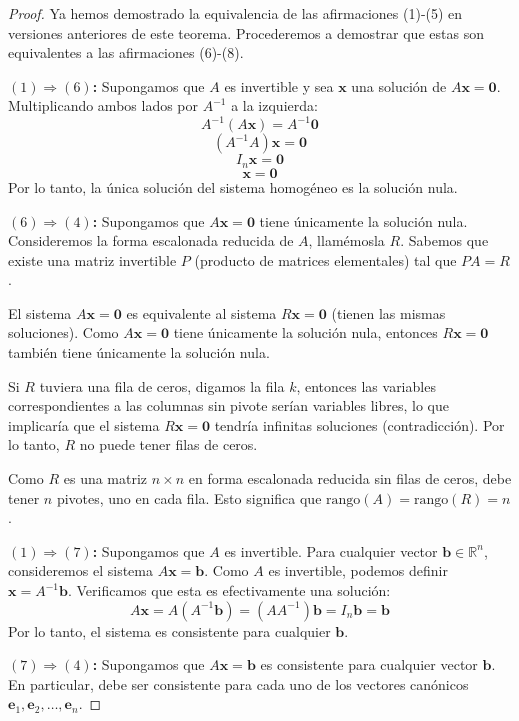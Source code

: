 \begin{proof}
Ya hemos demostrado la equivalencia de las afirmaciones (1)-(5) en versiones anteriores de este teorema. Procederemos a demostrar que estas son equivalentes a las afirmaciones (6)-(8).

\textbf{$(1) \Rightarrow (6)$:}
Supongamos que $A$ es invertible y sea $\mathbf{x}$ una solución de $A\mathbf{x}=\mathbf{0}$. Multiplicando ambos lados por $A^{-1}$ a la izquierda:
$$A^{-1}(A\mathbf{x}) = A^{-1}\mathbf{0}$$
$$(A^{-1}A)\mathbf{x} = \mathbf{0}$$
$$I_n\mathbf{x} = \mathbf{0}$$
$$\mathbf{x} = \mathbf{0}$$
Por lo tanto, la única solución del sistema homogéneo es la solución nula.

\textbf{$(6) \Rightarrow (4)$:}
Supongamos que $A\mathbf{x}=\mathbf{0}$ tiene únicamente la solución nula. Consideremos la forma escalonada reducida de $A$, llamémosla $R$. Sabemos que existe una matriz invertible $P$ (producto de matrices elementales) tal que $PA = R$.

El sistema $A\mathbf{x}=\mathbf{0}$ es equivalente al sistema $R\mathbf{x}=\mathbf{0}$ (tienen las mismas soluciones). Como $A\mathbf{x}=\mathbf{0}$ tiene únicamente la solución nula, entonces $R\mathbf{x}=\mathbf{0}$ también tiene únicamente la solución nula.

Si $R$ tuviera una fila de ceros, digamos la fila $k$, entonces las variables correspondientes a las columnas sin pivote serían variables libres, lo que implicaría que el sistema $R\mathbf{x}=\mathbf{0}$ tendría infinitas soluciones (contradicción). Por lo tanto, $R$ no puede tener filas de ceros.

Como $R$ es una matriz $n \times n$ en forma escalonada reducida sin filas de ceros, debe tener $n$ pivotes, uno en cada fila. Esto significa que $\text{rango}(A) = \text{rango}(R) = n$.

\textbf{$(1) \Rightarrow (7)$:}
Supongamos que $A$ es invertible. Para cualquier vector $\mathbf{b} \in \mathbb{R}^n$, consideremos el sistema $A\mathbf{x}=\mathbf{b}$. Como $A$ es invertible, podemos definir $\mathbf{x} = A^{-1}\mathbf{b}$. Verificamos que esta es efectivamente una solución:
$$A\mathbf{x} = A(A^{-1}\mathbf{b}) = (AA^{-1})\mathbf{b} = I_n\mathbf{b} = \mathbf{b}$$
Por lo tanto, el sistema es consistente para cualquier $\mathbf{b}$.

\textbf{$(7) \Rightarrow (4)$:}
Supongamos que $A\mathbf{x}=\mathbf{b}$ es consistente para cualquier vector $\mathbf{b}$. En particular, debe ser consistente para cada uno de los vectores canónicos $\mathbf{e}_1, \mathbf{e}_2, \ldots, \mathbf{e}_n$.


\end{proof}
